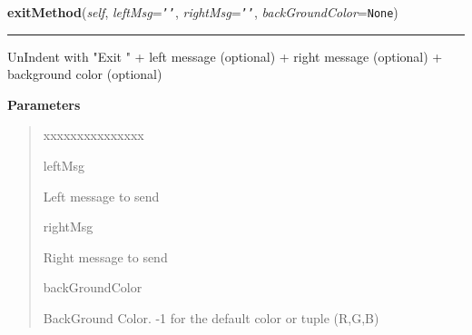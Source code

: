 \hspace{.8\funcindent}\begin{boxedminipage}{\funcwidth}

    \raggedright \textbf{exitMethod}(\textit{self}, \textit{leftMsg}={\tt \texttt{'}\texttt{}\texttt{'}}, \textit{rightMsg}={\tt \texttt{'}\texttt{}\texttt{'}}, \textit{backGroundColor}={\tt None})

    \vspace{-1.5ex}

    \rule{\textwidth}{0.5\fboxrule}
\setlength{\parskip}{2ex}
    UnIndent with "Exit " + left message (optional) + right message 
    (optional) + background color (optional)

\setlength{\parskip}{1ex}
      \textbf{Parameters}
      \vspace{-1ex}

      \begin{quote}
        \begin{Ventry}{xxxxxxxxxxxxxxx}

          \item[leftMsg]

          Left message to send

          \item[rightMsg]

          Right message to send

          \item[backGroundColor]

          BackGround Color. -1 for the default color or tuple (R,G,B)

        \end{Ventry}

      \end{quote}

    \end{boxedminipage}

    \label{tracetool:TraceToSend:prepareNewNode}

    \vspace{0.5ex}

